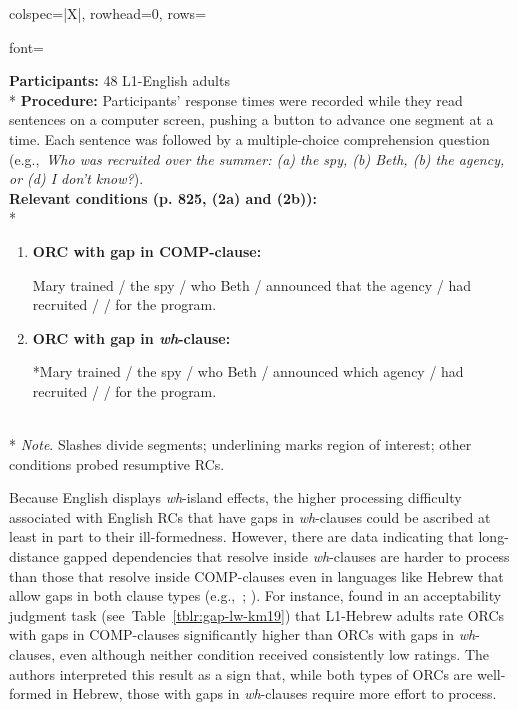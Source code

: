 \begin{longtblr}[caption={\textcite{hammerly2022}: Self-paced reading task}, label={tblr:gap-lw-h22}]{colspec={|X|}, rowhead=0, rows={font=\raggedright{}}}\hline
\textbf{Participants:} 48 L1-English adults \vspace{5pt}\\*
\textbf{Procedure:} Participants' response times were recorded while they read sentences on a computer screen, pushing a button to advance one segment at a time. Each sentence was followed by a multiple-choice comprehension question (e.g.,~\textit{Who was recruited over the summer: (a) the spy, (b) Beth, (b) the agency, or (d) I don't know?}). \vspace{5pt}\\
\textbf{Relevant conditions (p. 825, (2a) and (2b)):} \vspace{5pt}\\*
\begin{varwidth}{\linewidth}\begin{enumerate}[\bfseries (a),itemsep=5pt] 
\item \textbf{ORC with gap in COMP-clause:}\par\nobreak\vspace{3pt}
Mary trained / the spy / who Beth / announced that the agency / had recruited /  / for the program.
\item \textbf{ORC with gap in \textit{wh}-clause:}\par\nobreak\vspace{3pt}
*Mary trained / the spy / who Beth / announced which agency / had recruited /  / for the program.
\end{enumerate}\end{varwidth}\vspace{5pt}\\*
\textit{Note}. Slashes divide segments; underlining marks region of interest; other conditions probed resumptive RCs. \\\hline
\end{longtblr}

Because English displays \textit{wh}-island effects, the higher processing difficulty associated with English RCs that have gaps in \textit{wh}-clauses could be ascribed at least in part to their ill-formedness. However, there are data indicating that long-distance gapped dependencies that resolve inside \textit{wh}-clauses are harder to process than those that resolve inside COMP-clauses even in languages like Hebrew that allow gaps in both clause types (e.g.,~\cite{keshev.meltzer-asscher2019}; \cite{reinhart1981}). For instance, \textcite{keshev.meltzer-asscher2019} found in an acceptability judgment task (see~Table~\ref{tblr:gap-lw-km19}) that L1-Hebrew adults rate ORCs with gaps in COMP-clauses significantly higher than ORCs with gaps in \textit{wh}-clauses, even although neither condition received consistently low ratings. The authors interpreted this result as a sign that, while both types of ORCs are well-formed in Hebrew, those with gaps in \textit{wh}-clauses require more effort to process. 

